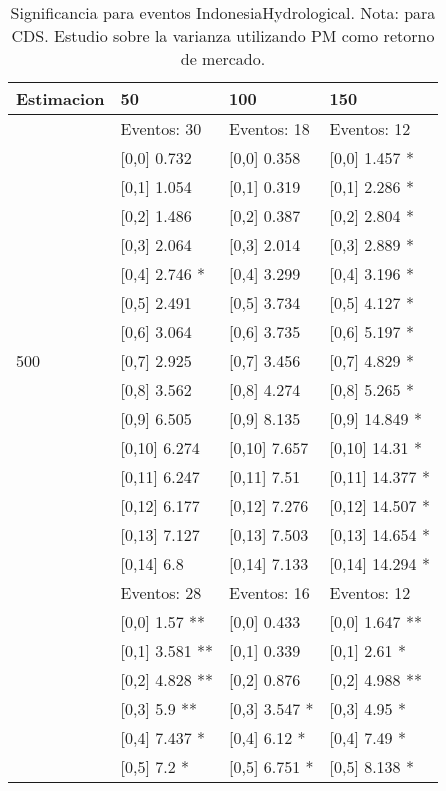 \begin{table}

\caption{Significancia para eventos IndonesiaHydrological. Nota: para CDS. Estudio sobre la varianza utilizando PM como retorno de mercado.}
\centering
\begin{tabular}[t]{llll}
\toprule
Estimacion & 50 & 100 & 150\\
\midrule
 & Eventos:  30 & Eventos:  18 & Eventos:  12\\
 & {}[0,0] 0.732 & {}[0,0] 0.358 & {}[0,0] 1.457 *\\
 & {}[0,1] 1.054 & {}[0,1] 0.319 & {}[0,1] 2.286 *\\
 & {}[0,2] 1.486 & {}[0,2] 0.387 & {}[0,2] 2.804 *\\
 & {}[0,3] 2.064 & {}[0,3] 2.014 & {}[0,3] 2.889 *\\
\addlinespace
 & {}[0,4] 2.746 * & {}[0,4] 3.299 & {}[0,4] 3.196 *\\
 & {}[0,5] 2.491 & {}[0,5] 3.734 & {}[0,5] 4.127 *\\
 & {}[0,6] 3.064 & {}[0,6] 3.735 & {}[0,6] 5.197 *\\
500 & {}[0,7] 2.925 & {}[0,7] 3.456 & {}[0,7] 4.829 *\\
 & {}[0,8] 3.562 & {}[0,8] 4.274 & {}[0,8] 5.265 *\\
\addlinespace
 & {}[0,9] 6.505 & {}[0,9] 8.135 & {}[0,9] 14.849 *\\
 & {}[0,10] 6.274 & {}[0,10] 7.657 & {}[0,10] 14.31 *\\
 & {}[0,11] 6.247 & {}[0,11] 7.51 & {}[0,11] 14.377 *\\
 & {}[0,12] 6.177 & {}[0,12] 7.276 & {}[0,12] 14.507 *\\
 & {}[0,13] 7.127 & {}[0,13] 7.503 & {}[0,13] 14.654 *\\
\addlinespace
 & {}[0,14] 6.8 & {}[0,14] 7.133 & {}[0,14] 14.294 *\\
 & Eventos:  28 & Eventos:  16 & Eventos:  12\\
 & {}[0,0] 1.57 ** & {}[0,0] 0.433 & {}[0,0] 1.647 **\\
 & {}[0,1] 3.581 ** & {}[0,1] 0.339 & {}[0,1] 2.61 *\\
 & {}[0,2] 4.828 ** & {}[0,2] 0.876 & {}[0,2] 4.988 **\\
\addlinespace
 & {}[0,3] 5.9 ** & {}[0,3] 3.547 * & {}[0,3] 4.95 *\\
 & {}[0,4] 7.437 * & {}[0,4] 6.12 * & {}[0,4] 7.49 *\\
 & {}[0,5] 7.2 * & {}[0,5] 6.751 * & {}[0,5] 8.138 *\\

\end{tabular}
\end{table}
